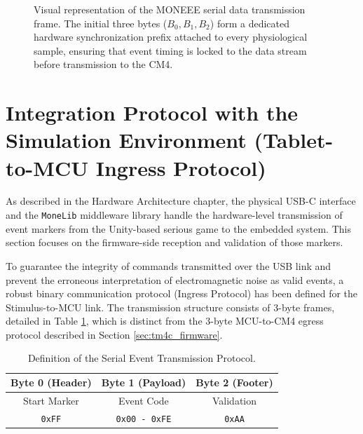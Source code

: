 \begin{figure}[ht]
    \caption{Visual representation of the MONEEE serial data transmission frame. The initial three bytes ($B_0, B_1, B_2$) form a dedicated hardware synchronization prefix attached to every physiological sample, ensuring that event timing is locked to the data stream before transmission to the CM4.}
    \label{fig:moneee_frame_structure}
\end{figure}

\section{Integration Protocol with the Simulation Environment (Tablet-to-MCU Ingress Protocol)}
\label{sec:game_integration}

As described in the Hardware Architecture chapter, the physical USB-C interface and the \texttt{MoneLib} middleware library handle the hardware-level transmission of event markers from the Unity-based serious game to the embedded system. This section focuses on the firmware-side reception and validation of those markers.

To guarantee the integrity of commands transmitted over the USB link and prevent the erroneous interpretation of electromagnetic noise as valid events, a robust binary communication protocol (Ingress Protocol) has been defined for the Stimulus-to-MCU link. The transmission structure consists of 3-byte frames, detailed in Table \ref{tab:protocol}, which is distinct from the 3-byte MCU-to-CM4 egress protocol described in Section \ref{sec:tm4c_firmware}.

\begin{table}[ht]
    \centering
    \caption{Definition of the Serial Event Transmission Protocol.}
    \label{tab:protocol}
    \begin{tabular}{ccc}
        \toprule
        \textbf{Byte 0 (Header)} & \textbf{Byte 1 (Payload)} & \textbf{Byte 2 (Footer)} \\
        \midrule
        Start Marker             & Event Code                & Validation               \\
        \texttt{0xFF}            & \texttt{0x00 - 0xFE}      & \texttt{0xAA}            \\
        \bottomrule
    \end{tabular}
\end{table}


